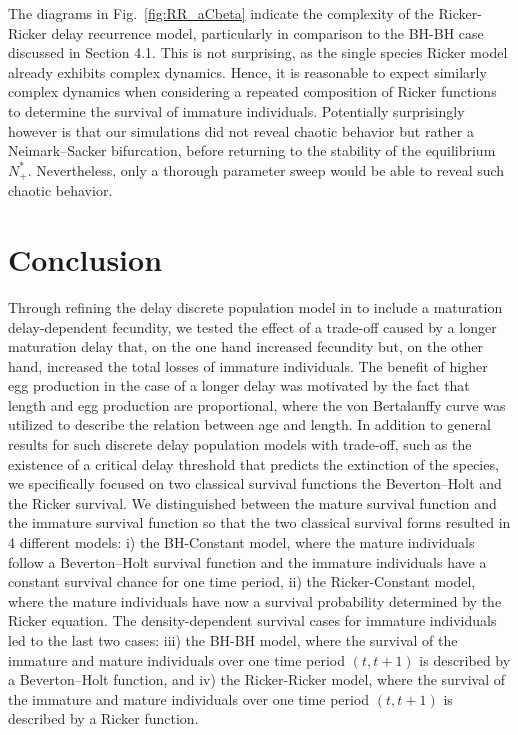 \documentclass{article}
\numberwithin{theorem}{section}
\begin{document}
{The diagrams in Fig.~\ref{fig:RR_aCbeta} indicate the complexity of the Ricker-Ricker delay recurrence model, particularly in comparison to the BH-BH case discussed in Section 4.1. This is not surprising, as the single species Ricker model already exhibits complex dynamics. Hence, it is reasonable to expect similarly complex dynamics when considering a repeated composition of Ricker functions to determine the survival of immature individuals. Potentially surprisingly however is that our simulations did not reveal chaotic behavior but rather a Neimark--Sacker bifurcation, before returning to the stability of the equilibrium $N^*_+$. Nevertheless, only a thorough parameter sweep would be able to reveal such chaotic behavior.  

\section{Conclusion}
Through refining the delay discrete population model in \cite{StWodelay2} to include  a maturation 
delay-dependent fecundity, we tested the effect of a trade-off caused by a longer maturation delay that, on the one hand increased fecundity but, on the other hand, increased the total losses of immature individuals. The benefit of higher egg production in the case of a longer delay was motivated by the fact that length and egg production are proportional, where the von Bertalanffy curve was utilized to describe the relation between age and length.  In addition to general results for such discrete delay population models with trade-off, such as the existence of a critical delay threshold that predicts the extinction of the species, 
we specifically focused on two classical survival functions \textemdash the Beverton--Holt and the Ricker survival. We distinguished between the mature survival function and the immature survival function so that the two classical survival forms resulted in 4 different models: i) the BH-Constant model, where the mature individuals follow a Beverton--Holt survival function and the immature individuals have a constant survival chance for one time period, ii) the Ricker-Constant model, where the mature individuals have now a  survival probability determined by the Ricker equation. The density-dependent survival cases for immature individuals led to the last two cases: iii) the BH-BH model, where the survival of the immature and mature individuals over one time period $(t,t+1)$ is described by a Beverton--Holt function, and iv) the Ricker-Ricker model, where the survival of the immature and mature individuals over one time period $(t,t+1)$ is described by a Ricker function. 

}
\end{document}
